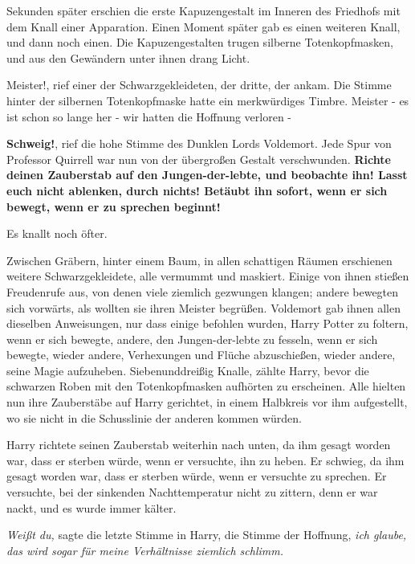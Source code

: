 Sekunden später erschien die erste Kapuzengestalt im Inneren des Friedhofs mit
dem Knall einer Apparation. Einen Moment später gab es einen weiteren Knall, und
dann noch einen. Die Kapuzengestalten trugen silberne Totenkopfmasken, und aus
den Gewändern unter ihnen drang Licht.

\glqq{}Meister!\grqq{}, rief einer der Schwarzgekleideten, der dritte, der ankam.
Die Stimme hinter der silbernen Totenkopfmaske hatte ein merkwürdiges Timbre.
\glqq{}Meister - es ist schon so lange her - wir hatten die Hoffnung verloren -\grqq{}

\glqq{}\textbf{Schweig!}\grqq{}, rief die hohe Stimme des Dunklen Lords
Voldemort. Jede Spur von Professor Quirrell war nun von der übergroßen Gestalt
verschwunden. \glqq{}\textbf{Richte deinen Zauberstab auf den Jungen-der-lebte,
und beobachte ihn! Lasst euch nicht ablenken, durch nichts! Betäubt ihn sofort,
wenn er sich bewegt, wenn er zu sprechen beginnt!}\grqq{}

Es knallt noch öfter.

Zwischen Gräbern, hinter einem Baum, in allen schattigen Räumen erschienen
weitere Schwarzgekleidete, alle vermummt und maskiert. Einige von ihnen stießen
Freudenrufe aus, von denen viele ziemlich gezwungen klangen; andere bewegten
sich vorwärts, als wollten sie ihren Meister begrüßen. Voldemort gab ihnen allen
dieselben Anweisungen, nur dass einige befohlen wurden, Harry Potter zu foltern,
wenn er sich bewegte, andere, den Jungen-der-lebte zu fesseln, wenn er sich
bewegte, wieder andere, Verhexungen und Flüche abzuschießen, wieder andere,
seine Magie aufzuheben. Siebenunddreißig Knalle, zählte Harry, bevor die
schwarzen Roben mit den Totenkopfmasken aufhörten zu erscheinen. Alle hielten
nun ihre Zauberstäbe auf Harry gerichtet, in einem Halbkreis vor ihm
aufgestellt, wo sie nicht in die Schusslinie der anderen kommen würden.

Harry richtete seinen Zauberstab weiterhin nach unten, da ihm gesagt worden war,
dass er sterben würde, wenn er versuchte, ihn zu heben. Er schwieg, da ihm
gesagt worden war, dass er sterben würde, wenn er versuchte zu sprechen. Er
versuchte, bei der sinkenden Nachttemperatur nicht zu zittern, denn er war
nackt, und es wurde immer kälter.

\emph{Weißt du,} sagte die letzte Stimme in Harry, die Stimme der Hoffnung,
\emph{ich glaube, das wird sogar für meine Verhältnisse ziemlich schlimm.}


